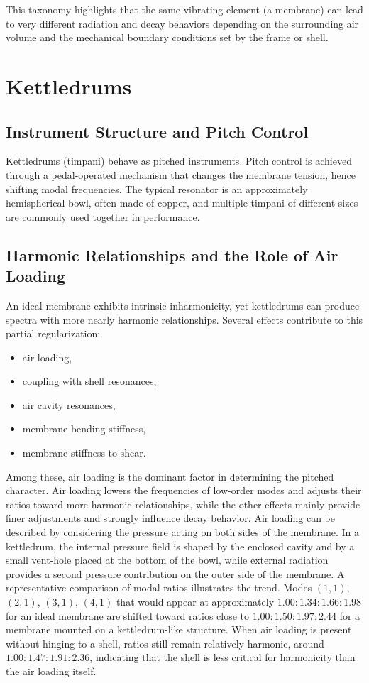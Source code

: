 This taxonomy highlights that the same vibrating element (a membrane) can lead to very different radiation and decay behaviors depending on the surrounding air volume and the mechanical boundary conditions set by the frame or shell.

\section{Kettledrums}

\subsection{Instrument Structure and Pitch Control}

Kettledrums (timpani) behave as pitched instruments. Pitch control is achieved through a pedal-operated mechanism that changes the membrane tension, hence shifting modal frequencies. The typical resonator is an approximately hemispherical bowl, often made of copper, and multiple timpani of different sizes are commonly used together in performance. 

\subsection{Harmonic Relationships and the Role of Air Loading}

An ideal membrane exhibits intrinsic inharmonicity, yet kettledrums can produce spectra with more nearly harmonic relationships. Several effects contribute to this partial regularization: 

\begin{itemize}
    \item air loading,
    \item coupling with shell resonances,
    \item air cavity resonances,
    \item membrane bending stiffness,
    \item membrane stiffness to shear.
\end{itemize}

Among these, air loading is the dominant factor in determining the pitched character. Air loading lowers the frequencies of low-order modes and adjusts their ratios toward more harmonic relationships, while the other effects mainly provide finer adjustments and strongly influence decay behavior. Air loading can be described by considering the pressure acting on both sides of the membrane. In a kettledrum, the internal pressure field is shaped by the enclosed cavity and by a small vent-hole placed at the bottom of the bowl, while external radiation provides a second pressure contribution on the outer side of the membrane. A representative comparison of modal ratios illustrates the trend. Modes \((1, 1)\), \((2, 1)\), \((3, 1)\), \((4, 1)\) that would appear at approximately \( 1.00 : 1.34 : 1.66 : 1.98 \) for an ideal membrane are shifted toward ratios close to \( 1.00 : 1.50 : 1.97 : 2.44 \) for a membrane mounted on a kettledrum-like structure. When air loading is present without hinging to a shell, ratios still remain relatively harmonic, around \( 1.00 : 1.47 : 1.91 : 2.36 \), indicating that the shell is less critical for harmonicity than the air loading itself. 

